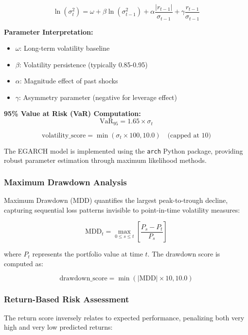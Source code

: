 \documentclass[3p,times,procedia]{elsarticle}
\begin{document}
\begin{equation}
\ln(\sigma_t^2) = \omega + \beta \ln(\sigma_{t-1}^2) + \alpha \frac{|r_{t-1}|}{\sigma_{t-1}} + \gamma \frac{r_{t-1}}{\sigma_{t-1}}
\end{equation}

\textbf{Parameter Interpretation:}
\begin{itemize}
    \item $\omega$: Long-term volatility baseline
    \item $\beta$: Volatility persistence (typically 0.85-0.95)
    \item $\alpha$: Magnitude effect of past shocks
    \item $\gamma$: Asymmetry parameter (negative for leverage effect)
\end{itemize}

\textbf{95\% Value at Risk (VaR) Computation:}
\begin{equation}
\text{VaR}_{95} = 1.65 \times \sigma_t
\end{equation}

\begin{equation}
\text{volatility\_score} = \min(\sigma_t \times 100, 10.0) \quad \text{(capped at 10)}
\end{equation}

The EGARCH model is implemented using the \texttt{arch} Python package, providing robust parameter estimation through maximum likelihood methods.
\subsubsection{{Maximum Drawdown Analysis}}
Maximum Drawdown (MDD) quantifies the largest peak-to-trough decline, capturing sequential loss patterns invisible to point-in-time volatility measures:

\begin{equation}
\text{MDD}_t = \max_{0 \leq s \leq t} \left[ \frac{P_s - P_t}{P_s} \right]
\end{equation}

where $P_t$ represents the portfolio value at time $t$. The drawdown score is computed as:

\begin{equation}
\text{drawdown\_score} = \min(|\text{MDD}| \times 10, 10.0)
\end{equation}

\subsubsection{{Return-Based Risk Assessment}}
The return score inversely relates to expected performance, penalizing both very high and very low predicted returns:
\end{document}
